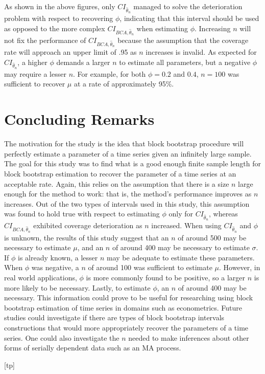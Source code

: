 \documentclass[12pt, letterpaper, titlepage]{article}
\begin{document}
As shown in the above figures, only $CI_{\hat{\theta}_{n}}$ managed to solve
the deterioration problem with respect to recovering $\phi$, indicating that
this interval should be used as opposed to the more complex
$CI_{BCA, \hat{\theta}_{n}}$ when estimating $\phi$. Increasing $n$ will not
fix the performance of $CI_{BCA, \hat{\theta}_{n}}$ because the assumption that
the coverage rate will approach an upper limit of .95 as $n$ increases is
invalid. As expected for $CI_{\hat{\theta}_{n}}$, a higher $\phi$ demands a
larger $n$ to estimate all parameters, but a negative $\phi$ may require a
lesser $n$. For example, for both $\phi = 0.2$ and $0.4$, $n = 100$ was
sufficient to recover $\mu$ at a rate of approximately 95\%.


\section{Concluding Remarks}
\label{sec:conremarks}

The motivation for the study is the idea that block bootstrap procedure will
perfectly estimate a parameter of a time series given an infinitely large
sample. The goal for this study was to find what is a good enough finite
sample length for block bootstrap estimation to recover the parameter of a
time series at an acceptable rate. Again, this relies on the assumption that
there is a size $n$ large enough for the method to work: that is, the method's
performance improves as $n$ increases. Out of the two types of intervals used
in this study, this assumption was found to hold true with respect to
estimating $\phi$ only for $CI_{\hat{\theta}_{n}}$, whereas
$CI_{BCA, \hat{\theta}_{n}}$ exhibited coverage deterioration as $n$
increased. When using $CI_{\hat{\theta}_{n}}$ and $\phi$ is unknown, the
results of this study suggest that an $n$ of around 500 may be necessary to
estimate $\mu$, and an $n$ of around 400 may be necessary to estimate
$\sigma$. If $\phi$ is already known, a lesser $n$ may be adequate to estimate
these parameters. When $\phi$ was negative, a $n$ of around 100 was sufficient
to estimate $\mu$. However, in real world applications, $\phi$ is more
commonly found to be positive, so a larger $n$ is more likely to be necessary.
Lastly, to estimate $\phi$, an $n$ of around 400 may be necessary. This
information could prove to be useful for researching using block bootstrap
estimation of time series in domains such as econometrics. Future studies
could investigate if there are types of block bootstrap intervals
constructions that would more appropriately recover the parameters of a time
series. One could also investigate the $n$ needed to make inferences about
other forms of serially dependent data such as an MA process.



[tp]
\end{document}
